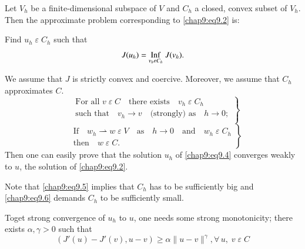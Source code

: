 \medskip
{}

 Let $V_h$ be a finite-dimensional
subspace of $V$ and $C_h$ a closed, convex subset of $V_h$. Then the
approximate problem corresponding to \eqref{chap9:eq9.2} is:

Find $u_h\;\varepsilon\;C_h$ such that 
\begin{equation}\label{chap9:eq9.4}
J(u_h)=\underset{v_h\varepsilon C_h}{\operatorname{Inf}}\;J(v_h).
\end{equation}

We assume that $J$ is strictly convex and coercive. Moreover, we
assume that $C_h$ approximates $C$.
\begin{equation}
\left.
\begin{aligned}
&\text{For all } v\;\varepsilon \;C\quad\text{there exists}\quad
v_h \;\varepsilon \;C_h\\
&\text{such that}\quad v_h\to v\quad\text{(strongly) as}\quad h\to
0;\\ \label{chap9:eq9.5}
\end{aligned}
\right\}
\end{equation}
\begin{equation}
\left.
\begin{aligned}
&\text{If}\quad w_h\rightharpoonup w\;\varepsilon \;V\quad\text{as}
\quad h\to 0\quad\text{and}\quad w_h\;\varepsilon \;C_h\\
&\text{then}\quad w\;\varepsilon \;C. \label{chap9:eq9.6}
\end{aligned}
\right\}
\end{equation}
Then one can easily prove that the solution $u_h$ of
\eqref{chap9:eq9.4} converges weakly to $u$, the solution of
\eqref{chap9:eq9.2}.

Note that \eqref{chap9:eq9.5} implies that $C_h$ has to be
sufficiently big and \eqref{chap9:eq9.6} demands $C_h$ to be
sufficiently small.

To\pageoriginale get strong convergence of $u_h$ to $u$, one needs
some strong monotonicity; there exists $\alpha,\gamma >0$ such that 
\begin{equation}\label{chap9:eq9.7}
(J'(u)-J'(v),u-v)\geq\alpha\parallel u-v\parallel^\gamma,\forall \,u,
\;v \;\varepsilon \;C
\end{equation}

